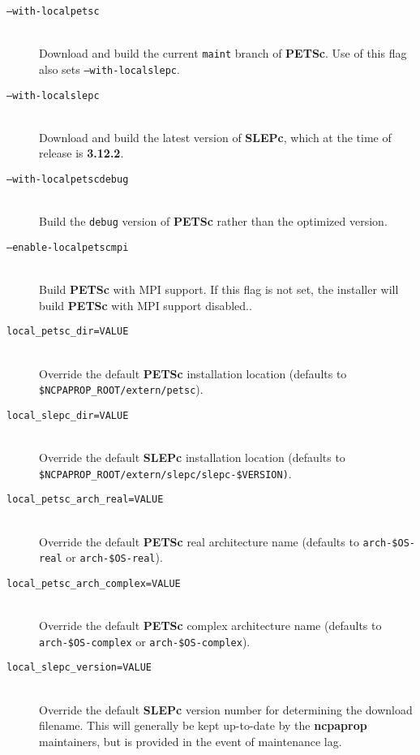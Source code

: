 \begin{description}
\item[\texttt{--with-localpetsc}]\hfill \\
\noindent
Download and build the current \texttt{maint} branch of \textbf{PETSc}.  Use of this flag also sets \texttt{--with-localslepc}.

\item[\texttt{--with-localslepc}]\hfill \\
\noindent
Download and build the latest version of \textbf{SLEPc}, which at the time of release is \textbf{3.12.2}.

\item[\texttt{--with-localpetscdebug}]\hfill \\
\noindent
Build the \texttt{debug} version of \textbf{PETSc} rather than the optimized version.

\item[\texttt{--enable-localpetscmpi}]\hfill \\
\noindent
Build \textbf{PETSc} with MPI support.  If this flag is not set, the installer will build \textbf{PETSc} with MPI support disabled..

\item[\texttt{local\_petsc\_dir=VALUE}]\hfill \\
\noindent
Override the default \textbf{PETSc} installation location (defaults to \texttt{\$NCPAPROP\_ROOT/extern/petsc}).

\item[\texttt{local\_slepc\_dir=VALUE}]\hfill \\
\noindent
Override the default \textbf{SLEPc} installation location (defaults to \texttt{\$NCPAPROP\_ROOT/extern/slepc/slepc-\$VERSION)}.

\item[\texttt{local\_petsc\_arch\_real=VALUE}]\hfill \\
\noindent
Override the default \textbf{PETSc} real architecture name (defaults to \texttt{arch-\$OS-real} or \texttt{arch-\$OS-real}).

\item[\texttt{local\_petsc\_arch\_complex=VALUE}]\hfill \\
\noindent
Override the default \textbf{PETSc} complex architecture name (defaults to \texttt{arch-\$OS-complex} or \texttt{arch-\$OS-complex}).

\item[\texttt{local\_slepc\_version=VALUE}]\hfill \\
\noindent
Override the default \textbf{SLEPc} version number for determining the download filename.  This will generally be kept up-to-date by the \textbf{ncpaprop} maintainers, but is provided in the event of maintenance lag.
\end{description}

